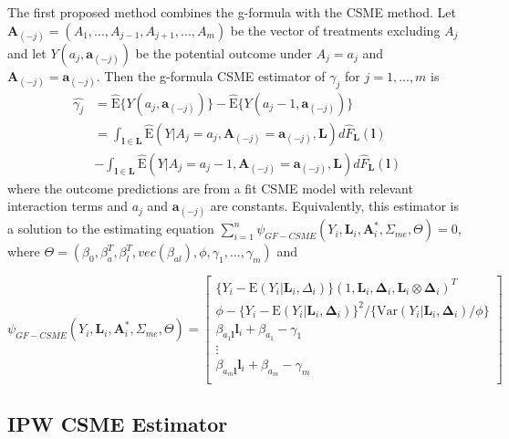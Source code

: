 \documentclass[useAMS,usenatbib,referee]{biom}
\begin{document}
\sloppy The first proposed method combines the g-formula with the CSME method. Let $\bm{A}_{(-j)} = (A_{1}, ..., A_{j-1}, A_{j+1}, ..., A_{m})$ be the vector of treatments excluding $A_{j}$ and let $Y(a_{j}, \bm{a}_{(-j)})$ be the potential outcome under $A_{j} = a_{j}$ and $\bm{A}_{(-j)} = \bm{a}_{(-j)}$. Then the g-formula CSME estimator of $\gamma_{j}$ for $j = 1,...,m$ is
\begin{align*}
    \hat{\gamma_{j}} &= \hat{\text{E}}\{ Y(a_{j}, \bm{a}_{(-j)}) \} - \hat{\text{E}}\{ Y(a_{j} - 1, \bm{a}_{(-j)}) \} \\
    &= \int_{\bm{l} \in \bm{L}} \hat{\text{E}}(Y | A_{j} = a_{j}, \bm{A}_{(-j)} = \bm{a}_{(-j)}, \bm{L}) d\hat{F}_{\bm{L}}(\bm{l}) \\
    &- \int_{\bm{l} \in \bm{L}} \hat{\text{E}}(Y | A_{j} = a_{j} - 1, \bm{A}_{(-j)} = \bm{a}_{(-j)}, \bm{L}) d\hat{F}_{\bm{L}}(\bm{l})
\end{align*}
where the outcome predictions are from a fit CSME model with relevant interaction terms and $a_{j}$ and $\bm{a}_{(-j)}$ are constants. Equivalently, this estimator is a solution to the estimating equation $\sum_{i=1}^{n} \psi_{GF-CSME}(Y_{i}, \bm{L}_{i}, \bm{A}_{i}^{*}, \Sigma_{me}, \Theta) = 0$, where $\Theta = (\beta_{0}, \beta^{T}_{a}, \beta^{T}_{l}, vec(\beta_{al}), \phi, \gamma_{1}, ..., \gamma_{m})$ and

\begin{equation}
    \psi_{GF-CSME}(Y_{i}, \bm{L}_{i}, \bm{A}^{*}_{i}, \Sigma_{me}, \Theta) =
    \begin{bmatrix}
       \{ Y_{i} - \text{E}(Y_{i} | \bm{L}_{i}, \Delta_{i}) \} (1, \bm{L}_{i}, \bm{\Delta}_{i}, \bm{L}_{i} \otimes \bm{\Delta}_{i})^{T} \\
        \phi - \{ Y_{i} - \text{E}(Y_{i} | \bm{L}_{i}, \bm{\Delta}_{i}) \}^{2} / \{ \text{Var}(Y_{i} | \bm{L}_{i}, \bm{\Delta}_{i}) / \phi \} \\
        \beta_{a_{1}\bm{l}}\bm{l}_{i} + \beta_{a_{1}} - \gamma_{1} \\
        \vdots \\
        \beta_{a_{m}\bm{l}}\bm{l}_{i} + \beta_{a_{m}} - \gamma_{m} \\
    \end{bmatrix}
\end{equation}

\subsection{IPW CSME Estimator}
\end{document}
